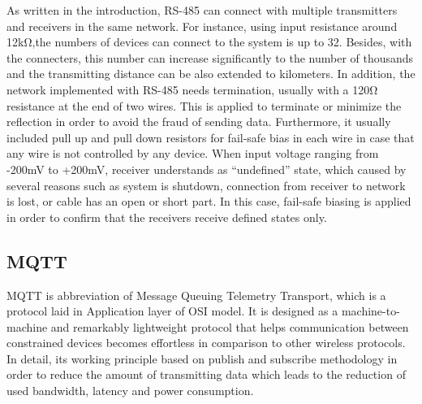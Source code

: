     As written in the introduction, RS-485 can connect with multiple transmitters and receivers in the same network. For instance, using input resistance around 12k\si{\ohm},the numbers of devices can connect to the system is up to 32. Besides, with the connecters, this number can increase significantly to the number of thousands and the transmitting distance can be also extended to kilometers. In addition, the network implemented with RS-485 needs termination, usually with a 120\si{\ohm} resistance at the end of two wires. This is applied to terminate or minimize the reflection in order to avoid the fraud of sending data. Furthermore, it usually included pull up and pull down resistors for fail-safe bias in each wire in case that any wire is not controlled by any device. When input voltage ranging from -200mV to +200mV, receiver understands as “undefined” state, which caused by several reasons such as system is shutdown, connection from receiver to network is lost, or cable has an open or short part. In this case, fail-safe biasing is applied in order to confirm that the receivers receive defined states only.

    \subsection{MQTT}
    MQTT is abbreviation of Message Queuing Telemetry Transport, which is a protocol laid in Application layer of OSI model. It is designed as a machine-to-machine and remarkably lightweight protocol that helps communication between constrained devices becomes effortless in comparison to other wireless protocols. In detail, its working principle based on publish and subscribe methodology in order to reduce the amount of transmitting data which leads to the reduction of used bandwidth, latency and power consumption.

